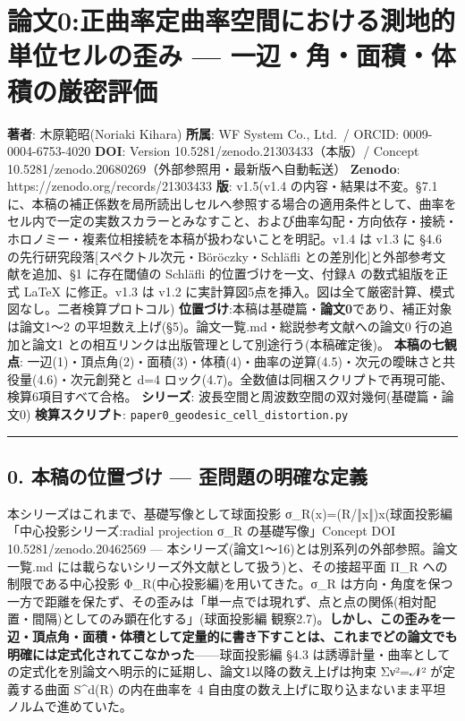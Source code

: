 \documentclass[
]{ltjsarticle}
\author{}
\date{}
\begin{document}
\section{論文0:正曲率定曲率空間における測地的単位セルの歪み ---
一辺・角・面積・体積の厳密評価}\label{ux8ad6ux65870ux6b63ux66f2ux7387ux5b9aux66f2ux7387ux7a7aux9593ux306bux304aux3051ux308bux6e2cux5730ux7684ux5358ux4f4dux30bbux30ebux306eux6b6aux307f-ux4e00ux8fbaux89d2ux9762ux7a4dux4f53ux7a4dux306eux53b3ux5bc6ux8a55ux4fa1}

\textbf{著者}: 木原範昭(Noriaki Kihara) \textbf{所属}: WF System Co.,
Ltd.~/ ORCID: 0009-0004-6753-4020 \textbf{DOI}: Version
10.5281/zenodo.21303433（本版）/ Concept
10.5281/zenodo.20680269（外部参照用・最新版へ自動転送） \textbf{Zenodo}:
https://zenodo.org/records/21303433 \textbf{版}: v1.5(v1.4
の内容・結果は不変。§7.1
に、本稿の補正係数を局所読出しセルへ参照する場合の適用条件として、曲率をセル内で一定の実数スカラーとみなすこと、および曲率勾配・方向依存・接続・ホロノミー・複素位相接続を本稿が扱わないことを明記。v1.4
は v1.3 に §4.6 の先行研究段落{[}スペクトル次元・Böröczky・Schläfli
との差別化{]}と外部参考文献を追加、§1 に存在閾値の Schläfli
的位置づけを一文、付録A の数式組版を正式 LaTeX に修正。v1.3 は v1.2
に実計算図5点を挿入。図は全て厳密計算、模式図なし。二者検算プロトコル)
\textbf{位置づけ}:本稿は基礎篇・\textbf{論文0}であり、補正対象は論文1〜2
の平坦数え上げ(§5)。論文一覧.md・総説参考文献への論文0 行の追加と論文1
との相互リンクは出版管理として別途行う(本稿確定後)。
\textbf{本稿の七観点}:
一辺(1)・頂点角(2)・面積(3)・体積(4)・曲率の逆算(4.5)・次元の曖昧さと共役量(4.6)・次元創発と
d=4 ロック(4.7)。全数値は同梱スクリプトで再現可能、検算6項目すべて合格。
\textbf{シリーズ}: 波長空間と周波数空間の双対幾何(基礎篇・論文0)
\textbf{検算スクリプト}: \texttt{paper0\_geodesic\_cell\_distortion.py}

\begin{center}\rule{0.5\linewidth}{0.5pt}\end{center}

\subsection{0. 本稿の位置づけ ---
歪問題の明確な定義}\label{ux672cux7a3fux306eux4f4dux7f6eux3065ux3051-ux6b6aux554fux984cux306eux660eux78baux306aux5b9aux7fa9}

本シリーズはこれまで、基礎写像として球面投影
σ\_R(x)=(R/‖x‖)x(球面投影編「中心投影シリーズ:radial projection σ\_R
の基礎写像」Concept DOI 10.5281/zenodo.20462569 ---
本シリーズ(論文1〜16)とは別系列の外部参照。論文一覧.md
には載らないシリーズ外文献として扱う)と、その接超平面 Π\_R
への制限である中心投影 Φ\_R(中心投影編)を用いてきた。σ\_R
は方向・角度を保つ一方で距離を保たず、その歪みは「単一点では現れず、点と点の関係(相対配置・間隔)としてのみ顕在化する」(球面投影編
観察2.7)。\textbf{しかし、この歪みを一辺・頂点角・面積・体積として定量的に書き下すことは、これまでどの論文でも明確には定式化されてこなかった}------球面投影編
§4.3
は誘導計量・曲率としての定式化を別論文へ明示的に延期し、論文1以降の数え上げは拘束
Σν²=𝒩² が定義する曲面 S\^{}d(R) の内在曲率を 4
自由度の数え上げに取り込まないまま平坦ノルムで進めていた。
\end{document}
